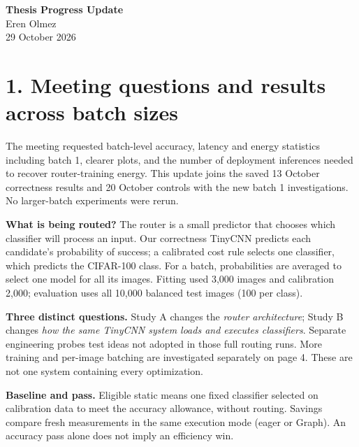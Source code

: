 \documentclass[10pt,a4paper]{article}
\newcommand{\heading}[1]{\section*{\color{navy}#1}}
\begin{document}
\begin{center}
{\Large\bfseries\color{navy}Thesis Progress Update}\\[3 pt]
{Eren Olmez}\\{29 October 2026}
\end{center}\vspace{-8 pt}
\heading{1. Meeting questions and results across batch sizes}
The meeting requested batch-level accuracy, latency and energy statistics including batch 1, clearer plots, and the number of deployment inferences needed to recover router-training energy. This update joins the saved 13 October correctness results and 20 October controls with the new batch 1 investigations. No larger-batch experiments were rerun.

\textbf{What is being routed?} The router is a small predictor that chooses which classifier will process an input. Our correctness TinyCNN predicts each candidate's probability of success; a calibrated cost rule selects one classifier, which predicts the CIFAR-100 class. For a batch, probabilities are averaged to select one model for all its images. Fitting used 3,000 images and calibration 2,000; evaluation uses all 10,000 balanced test images (100 per class).

\textbf{Three distinct questions.} Study A changes the \emph{router architecture}; Study B changes \emph{how the same TinyCNN system loads and executes classifiers}. Separate engineering probes test ideas not adopted in those full routing runs. More training and per-image batching are investigated separately on page 4. These are not one system containing every optimization.

\textbf{Baseline and pass.} Eligible static means one fixed classifier selected on calibration data to meet the accuracy allowance, without routing. Savings compare fresh measurements in the same execution mode (eager or Graph). An accuracy pass alone does not imply an efficiency win.
\end{document}
